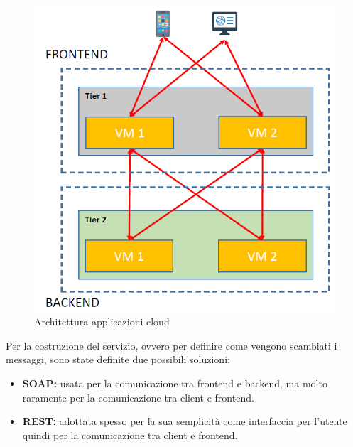 \documentclass{article}
\begin{document}
\begin{figure}[H]
\centering
\includegraphics[scale=0.5]{img/FeBe.PNG}
\caption{Architettura applicazioni cloud}
\end{figure}

Per la costruzione del servizio, ovvero per definire come vengono scambiati i messaggi, sono state definite due possibili soluzioni:
\begin{itemize}
    \item \textbf{SOAP:} usata per la comunicazione tra frontend e backend, ma molto raramente per la comunicazione tra client e frontend.
    \item \textbf{REST:} adottata spesso per la sua semplicità come interfaccia per l'utente quindi per la comunicazione tra client e frontend.
\end{itemize}
\end{document}
